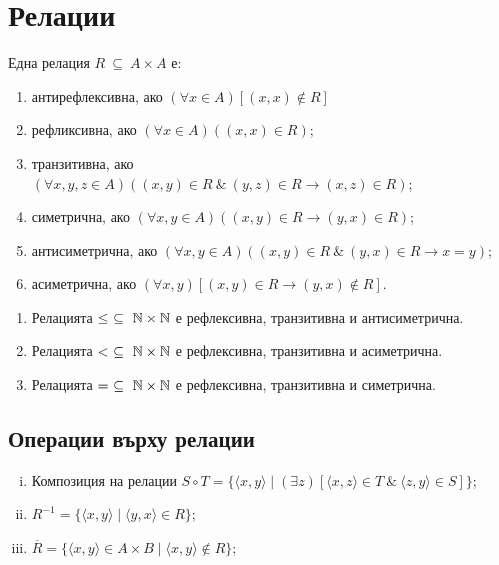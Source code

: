 \section*{Релации}

\begin{dfn}
  Една релация $R\ \subseteq\ A\times A$ е:
  \begin{enumerate}[1)]
  \item
    антирефлексивна, ако
    $(\forall x\in A)[(x,x)\not\in R]$
  \item
    рефликсивна, ако
    $(\forall x\in A)((x,x)\in R)$;
  \item
    транзитивна, ако
    $(\forall x,y,z\in A)((x,y)\in R\ \&\ (y,z)\in R \rightarrow (x,z)\in R)$;
  \item
    симетрична, ако
    $(\forall x,y\in A)((x,y)\in R \rightarrow (y,x)\in R)$;
  \item
    антисиметрична, ако
    $(\forall x,y\in A)((x,y)\in R\ \&\ (y,x)\in R \rightarrow x = y)$;
  \item
    асиметрична, ако
    $(\forall x,y)[(x,y)\in R \rightarrow (y,x)\not\in R]$.
\end{enumerate}
\end{dfn}

\begin{example}
  \begin{enumerate}[1)]
  \item
    Релацията $\leq\ \subseteq\ \Nat\times\Nat$ е рефлексивна, транзитивна и антисиметрична.
  \item
    Релацията $<\ \subseteq\ \Nat\times\Nat$ е рефлексивна, транзитивна и асиметрична.
  \item
    Релацията $=\ \subseteq\ \Nat\times\Nat$ е рефлексивна, транзитивна и симетрична.
  \end{enumerate}
\end{example}

\subsection*{Операции върху релации}
\begin{enumerate}[(i)]
\item
  Композиция на релации
  $S\circ T = \{\langle{x,y}\rangle \mid (\exists z)[\langle{x,z}\rangle\in T\ \&\ \langle{z,y}\rangle \in S]\}$;
\item
  $R^{-1} = \{\langle{x,y}\rangle \mid \langle{y,x}\rangle \in R\}$;
\item
  $\overline{R} = \{\langle{x,y}\rangle \in A\times B \mid\langle{x,y}\rangle\not\in R\}$;
\end{enumerate}

